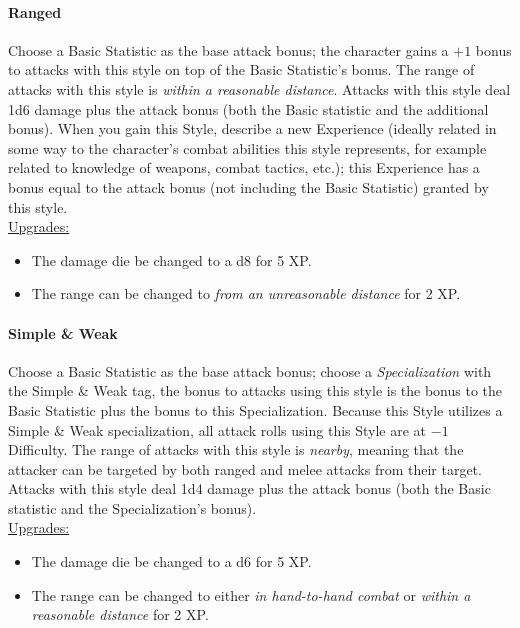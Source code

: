 \paragraph{Ranged}
Choose a Basic Statistic as the base attack bonus; the character gains a $+1$ bonus to attacks with this style on top of the Basic Statistic's bonus.
The range of attacks with this style is \emph{within a reasonable distance}.
Attacks with this style deal 1d6 damage plus the attack bonus (both the Basic statistic and the additional bonus).
When you gain this Style, describe a new Experience (ideally related in some way to the character's combat abilities this style represents, for example related to knowledge of weapons, combat tactics, etc.); this Experience has a bonus equal to the attack bonus (not including the Basic Statistic) granted by this style.
\\
\underline{Upgrades:}
\begin{itemize}
  \item[-] The damage die be changed to a d8 for 5 XP.
  \item[-] The range can be changed to \emph{from an unreasonable distance} for 2 XP.
\end{itemize}

\paragraph{Simple \& Weak}
Choose a Basic Statistic as the base attack bonus; choose a \emph{Specialization} with the Simple \& Weak tag, the bonus to attacks using this style is the bonus to the Basic Statistic plus the bonus to this Specialization.
Because this Style utilizes a Simple \& Weak specialization, all attack rolls using this Style are at $-1$ Difficulty.
The range of attacks with this style is \emph{nearby}, meaning that the attacker can be targeted by both ranged and melee attacks from their target.
Attacks with this style deal 1d4 damage plus the attack bonus (both the Basic statistic and the Specialization's bonus).
\\
\underline{Upgrades:}
\begin{itemize}
  \item[-] The damage die be changed to a d6 for 5 XP.
  \item[-] The range can be changed to either \emph{in hand-to-hand combat} or \emph{within a reasonable distance} for 2 XP.
\end{itemize}


